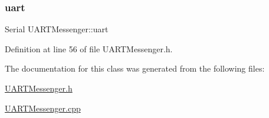 \subsubsection{\texorpdfstring{uart}{uart}}
{\footnotesize\ttfamily Serial U\+A\+R\+T\+Messenger\+::uart\hspace{0.3cm}{\ttfamily [private]}}



Definition at line 56 of file U\+A\+R\+T\+Messenger.\+h.



The documentation for this class was generated from the following files\+:\begin{DoxyCompactItemize}
\item 
\hyperlink{_u_a_r_t_messenger_8h}{U\+A\+R\+T\+Messenger.\+h}\item 
\hyperlink{_u_a_r_t_messenger_8cpp}{U\+A\+R\+T\+Messenger.\+cpp}\end{DoxyCompactItemize}
